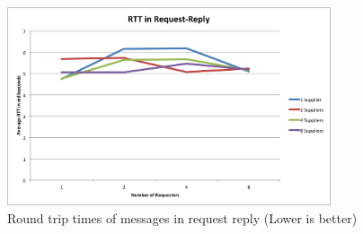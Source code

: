  \begin{figure}[H]
    \centering    \includegraphics[width=0.85\textwidth]{figures/10request-reply-rtt}
    \caption[Round trip times of messages in request reply]{Round trip times of messages in request reply (Lower is better)}
    \label{fig:result-request-reply-rtt}
  \end{figure}
